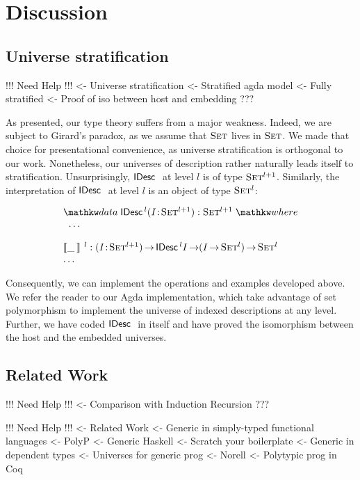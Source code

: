 \section{Discussion}
\label{sec:discussion}

\subsection{Universe stratification}

\begin{wstructure}
!!! Need Help !!!
<- Universe stratification
    <- Stratified agda model
        <- Fully stratified
        <- Proof of iso between host and embedding
    ???
\end{wstructure}

As presented, our type theory suffers from a major weakness. Indeed,
we are subject to Girard's paradox, as we assume that $\Set$ lives in
$\Set$. We made that choice for presentational convenience, as
universe stratification is orthogonal to our work. Nonetheless, our
universes of description rather naturally leads itself to
stratification. Unsurprisingly, $\IDesc{}$ at level $l$ is of type
$\Set^{\blue{l+1}}$. Similarly, the interpretation of $\IDesc{}$ at
level $l$ is an object of type $\Set^{\blue{l}}$:

\[\stk{
\data \IDesc{\!}^{\blue{l}} (\Bhab{\V{I}}{\Set^{\blue{l+1}}}) : \Set^{\blue{l+1}} \where \\
\;\;\ldots \\
\\
\idescop{\_\:}{}{}^{\blue{l}} : \PI{\V{I}}{\Set^{\blue{l+1}}} \IDesc{{\!}^{\blue{l}}I} \To (\V{I} \To \Set^{\blue{l}}) \To \Set^{\blue{l}}    \\
\ldots
}\]

Consequently, we can implement the operations and examples developed
above. We refer the reader to our Agda implementation, which take
advantage of set polymorphism to implement the universe of indexed
descriptions at any level. Further, we have coded $\IDesc{}$ in itself
and have proved the isomorphism between the host and the embedded
universes.

\subsection{Related Work}

\begin{structure}
!!! Need Help !!!
<- Comparison with Induction Recursion
    ???
\end{structure}


\begin{wstructure}
!!! Need Help !!!
<- Related Work
    <- Generic in simply-typed functional languages
        <- PolyP \cite{jansson:polyp}
        <- Generic Haskell \cite{hinze:generic-haskell}
        <- Scratch your boilerplate \cite{spj:syb}
    <- Generic in dependent types
        <- Universes for generic prog \cite{benke:universe-generic-prog}
        <- Norell \cite{norell:msc-thesis}
        <- Polytypic prog in Coq \cite{verbruggen:polytype-coq}
\end{wstructure}


